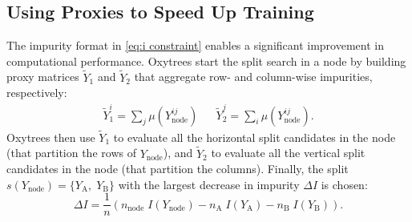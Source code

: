 \documentclass[letterpaper]{article}
\begin{document}
\subsection{Using Proxies to Speed Up Training}
\label{sec:oxytrees training}

The impurity format in \cref{eq:i constraint} enables a significant improvement in computational performance.
Oxytrees start the split search in a node by building proxy matrices $\tilde Y_1$ and $\tilde Y_2$ that aggregate row- and column-wise impurities, respectively:
\begin{align}
    \label{eq:proxies general}
    \textstyle
    \tilde Y_1^i = \sum_{j} \mu(Y_\text{node}^{ij})
    &&
    \textstyle
    \tilde Y_2^j = \sum_{i} \mu(Y_\text{node}^{ij})
    \text{.}
\end{align}
Oxytrees then use $\tilde Y_1$ to evaluate all the horizontal split candidates in the node (that partition the rows of $Y_\text{node}$), and $\tilde Y_2$ to evaluate all the vertical split candidates in the node (that partition the columns).
Finally, the split $s(Y_\text{node}) = \{Y_\text{A},\; Y_\text{B}\}$ with the largest decrease in impurity $\Delta I$ is chosen:
\begin{equation}
    \label{eq:delta i}
    \textstyle
    \Delta I =
        \frac{1}{n}(
            n_\text{node}\;I(Y_\text{node})
            - n_\text{A}\;I(Y_\text{A})
            - n_\text{B}\;I(Y_\text{B})
        )
        \text{.}
\end{equation}
\end{document}
